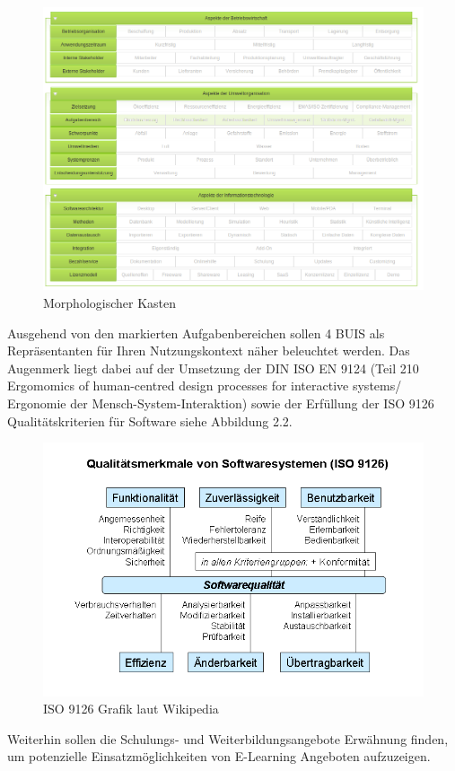 \documentclass[a4paper, 12pt, twoside, BCOR=20mm, DIV=calc, abstracton, parskip=half*, toc=bibliography, toc=listof, headsepline, footsepline, headings=small, numbers=enddot]{scrreprt}
\begin{document}
	\begin{figure}[h!]
		\includegraphics[width=\textwidth]{Bild/Morphologischer_Kasten_BUIS_Talus.png}
		\caption{Morphologischer Kasten}
	\end{figure}
	
	Ausgehend von den markierten Aufgabenbereichen sollen 4 \ac{BUIS} als Repräsentanten für Ihren Nutzungskontext näher beleuchtet werden. Das Augenmerk liegt dabei auf der Umsetzung der DIN ISO EN 9124 (Teil 210 Ergomomics of human-centred design processes for interactive systems/ Ergonomie der Mensch-System-Interaktion) \cite{ISO9241} sowie der Erfüllung der ISO 9126 Qualitätskriterien für Software siehe Abbildung 2.2.
	\begin{figure}[ht]
		\centering
		\includegraphics[width=\textwidth]{Bild/ISO_9126_Grafik.png}
		\caption[ISO 9126 Grafik]{ISO 9126 Grafik laut Wikipedia} %
	\end{figure} 
	Weiterhin sollen die Schulungs- und Weiterbildungsangebote Erwähnung finden, um potenzielle Einsatzmöglichkeiten von E-Learning Angeboten aufzuzeigen.  
	
\end{document}
